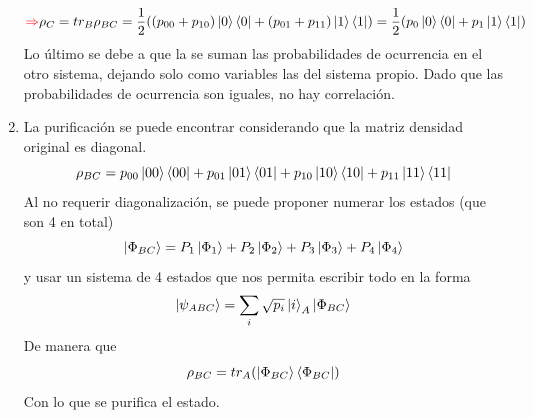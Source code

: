 \documentclass{book}
\begin{document}
\begin{enumerate}
    $$\textcolor{red}{\Rightarrow}\rho_C=tr_B\rho_{BC}=\frac{1}{2}((p_{00}+p_{10})\ket{0}\bra{0}+(p_{01}+p_{11})\ket{1}\bra{1})=\frac{1}{2}(p_0\ket{0}\bra{0}+p_1\ket{1}\bra{1})$$
    Lo último se debe a que la se suman las probabilidades de ocurrencia en el otro sistema, dejando solo como variables las del sistema propio. Dado que las probabilidades de ocurrencia son iguales, no hay correlación.
    \item La purificación se puede encontrar considerando que la matriz densidad original es diagonal.
    $$ \rho_{BC}=p_{00}\ket{00}\bra{00}+p_{01}\ket{01}\bra{01}+p_{10}\ket{10}\bra{10}+p_{11}\ket{11}\bra{11}$$
    Al no requerir diagonalización, se puede proponer numerar los estados (que son 4 en total) 
    $$ \ket{\Phi_{BC}}= P_1\ket{\Phi_1}+P_2\ket{\Phi_2}+P_3\ket{\Phi_3}+P_4\ket{\Phi_4}$$y usar un sistema de 4 estados que nos permita escribir todo en la forma
    $$ \ket{\psi_{ABC}}=\sum_i\sqrt{p_i}\ket{i}_A\ket{\Phi_{BC}}$$
    De manera que 
    $$ \rho_{BC}=tr_A(\ket{\Phi_{BC}}\bra{\Phi_{BC}})$$
    Con lo que se purifica el estado.
\end{enumerate}
\end{document}
